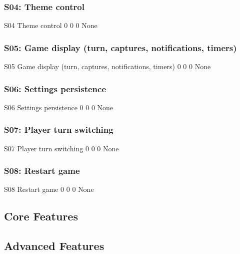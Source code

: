 \subsubsection{S04: Theme control}
    \begin{testsummary}
        {S04}
        {Theme control}
        {0}
        {0}
        {0}
        {None}
    \end{testsummary}

\subsubsection{S05: Game display (turn, captures, notifications, timers)}
    \begin{testsummary}
        {S05}
        {Game display (turn, captures, notifications, timers)}
        {0}
        {0}
        {0}
        {None}
    \end{testsummary}

\subsubsection{S06: Settings persistence}
    \begin{testsummary}
        {S06}
        {Settings persistence}
        {0}
        {0}
        {0}
        {None}
    \end{testsummary}

\subsubsection{S07: Player turn switching}
    \begin{testsummary}
        {S07}
        {Player turn switching}
        {0}
        {0}
        {0}
        {None}
    \end{testsummary}

\subsubsection{S08: Restart game}
    \begin{testsummary}
        {S08}
        {Restart game}
        {0}
        {0}
        {0}
        {None}
    \end{testsummary}

\subsection{Core Features}

\subsection{Advanced Features}

